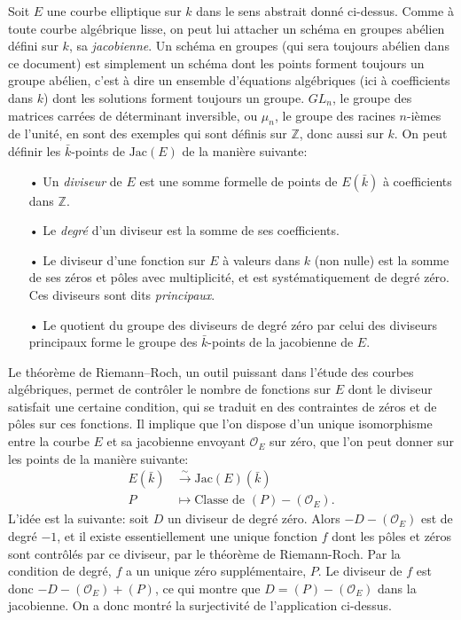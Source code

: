 \documentclass[11pt,a4paper]{article}
\newcommand{\Z}{\mathbb{Z}}
\renewcommand{\O}{\mathcal{O}}
\newcommand{\vers}{\longrightarrow}
\newcommand{\Jac}{\mathrm{Jac}}
\theoremstyle{definition}
\begin{document}
Soit $E$ une courbe elliptique sur $k$ dans le sens abstrait donné ci-dessus. Comme à toute courbe algébrique lisse, on peut lui attacher un schéma en groupes abélien défini sur $k$, sa \emph{jacobienne}. Un schéma en groupes (qui sera toujours abélien dans ce document) est simplement un schéma dont les points forment toujours un groupe abélien, c'est à dire un ensemble d'équations algébriques (ici à coefficients dans $k$) dont les solutions forment toujours un groupe. $GL_n$, le groupe des matrices carrées de déterminant inversible, ou $\mu_n$, le groupe des racines $n$-ièmes de l'unité, en sont des exemples qui sont définis sur $\Z$, donc aussi sur $k$. On peut définir les $\bar{k}$-points de $\Jac(E)$ de la manière suivante:
\begin{itemize}
\item[•] Un \emph{diviseur} de $E$ est une somme formelle de points de $E(\bar{k})$ à coefficients dans $\Z$.
\item[•] Le \emph{degré} d'un diviseur est la somme de ses coefficients.
\item[•] Le diviseur d'une fonction sur $E$ à valeurs dans $k$ (non nulle) est la somme de ses zéros et pôles avec multiplicité, et est systématiquement de degré zéro. Ces diviseurs sont dits \emph{principaux}.
\item[•] Le quotient du groupe des diviseurs de degré zéro par celui des diviseurs principaux forme le groupe des $\bar{k}$-points de la jacobienne de $E$.
\end{itemize}
Le théorème de Riemann--Roch, un outil puissant dans l'étude des courbes algébriques, permet de contrôler le nombre de fonctions sur $E$ dont le diviseur satisfait une certaine condition, qui se traduit en des contraintes de zéros et de pôles sur ces fonctions. Il implique que l'on dispose d'un unique isomorphisme entre la courbe $E$ et sa jacobienne envoyant $\O_E$ sur zéro, que l'on peut donner sur les points de la manière suivante:
$$\begin{aligned}
E(\bar{k}) &\overset{\sim}{\vers} \Jac(E)(\bar{k}) \\
P &\longmapsto \text{Classe de } (P) - (\O_E).
\end{aligned}$$
L'idée est la suivante: soit $D$ un diviseur de degré zéro. Alors $-D - (\O_E)$ est de degré $-1$, et il existe essentiellement une unique fonction $f$ dont les pôles et zéros sont contrôlés par ce diviseur, par le théorème de Riemann-Roch. Par la condition de degré, $f$ a un unique zéro supplémentaire, $P$. Le diviseur de $f$ est donc $- D - (\O_E) + (P)$, ce qui montre que $D = (P) - (\O_E)$ dans la jacobienne. On a donc montré la surjectivité de l'application ci-dessus.
\end{document}
